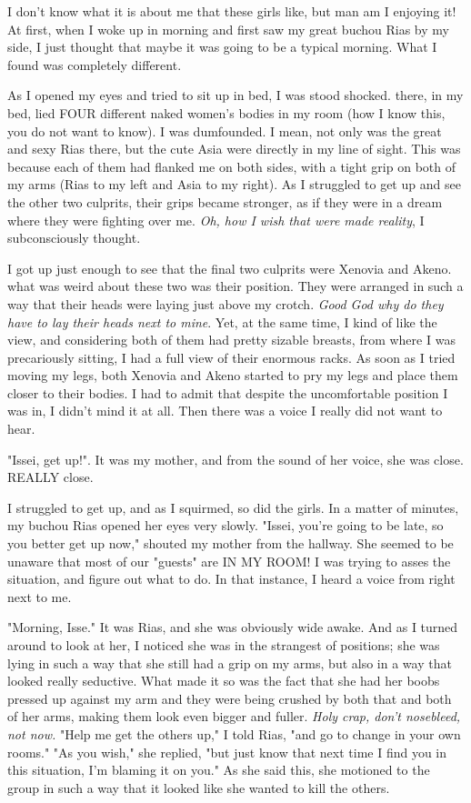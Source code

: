 \documentclass{article}
\begin{document}
I don't know what it is about me that these girls like, but man am I enjoying it! At first, when I woke up in morning and first saw my great buchou Rias by my side, I just thought that maybe it was going to be a typical morning. What I found was completely different.

As I opened my eyes and tried to sit up in bed, I was stood shocked. there, in my bed, lied FOUR different naked women's bodies in my room (how I know this, you do not want to know). I was dumfounded. I mean, not only was the great and sexy Rias there, but the cute Asia were directly in my line of sight. This was because each of them had flanked me on both sides, with a tight grip on both of my arms (Rias to my left and Asia to my right). As I struggled to get up and see the other two culprits, their grips became stronger, as if they were in a dream where they were fighting over me. \emph{Oh, how I wish that were made reality}, I subconsciously thought.

I got up just enough to see that the final two culprits were Xenovia and Akeno. what was weird about these two was their position. They were arranged in such a way that their heads were laying just above my crotch. \emph{Good God why do they have to lay their heads next to mine}. Yet, at the same time, I kind of like the view, and considering both of them had pretty sizable breasts, from where I was precariously sitting, I had a full view of their enormous racks. As soon as I tried moving my legs, both Xenovia and Akeno started to pry my legs and place them closer to their bodies. I had to admit that despite the uncomfortable position I was in, I didn't mind it at all. Then there was a voice I really did not want to hear.

"Issei, get up!". It was my mother, and from the sound of her voice, she was close. REALLY close.

I struggled to get up, and as I squirmed, so did the girls. In a matter of minutes, my buchou Rias opened her eyes very slowly. "Issei, you're going to be late, so you better get up now," shouted my mother from the hallway. She seemed to be unaware that most of our "guests" are IN MY ROOM! I was trying to asses the situation, and figure out what to do. In that instance, I heard a voice from right next to me.

"Morning, Isse." It was Rias, and she was obviously wide awake. And as I turned around to look at her, I noticed she was in the strangest of positions; she was lying in such a way that she still had a grip on my arms, but also in a way that looked really seductive. What made it so was the fact that she had her boobs pressed up against my arm and they were being crushed by both that and both of her arms, making them look even bigger and fuller. \emph{Holy crap, don't nosebleed, not now.} "Help me get the others up," I told Rias, "and go to change in your own rooms." "As you wish," she replied, "but just know that next time I find you in this situation, I'm blaming it on you." As she said this, she motioned to the group in such a way that it looked like she wanted to kill the others.
\end{document}
